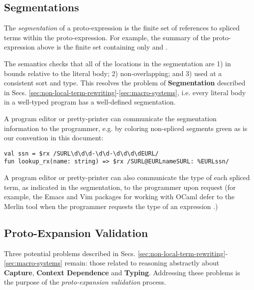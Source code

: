

\subsection{Segmentations}
The \emph{segmentation} of a proto-expression is the finite set of references to spliced terms within the proto-expression. For example, the summary of the proto-expression above is the finite set containing only  and .%

The semantics checks that all of the locations in the segmentation are 1) in bounds relative to the literal body; 2) non-overlapping; and 3) used at a consistent sort and type. 
This resolves the problem of \textbf{Segmentation} described in Secs. \ref{sec:non-local-term-rewriting}-\ref{sec:macro-systems}, i.e. every literal body in a well-typed program has a well-defined segmentation. 

A program editor or pretty-printer can communicate the segmentation information to the programmer, e.g. by coloring non-spliced segments green as is our convention in this document:
\begin{lstlisting}[numbers=none]
val ssn = $rx /SURL\d\d\d-\d\d-\d\d\d\dEURL/
fun lookup_rx(name: string) => $rx /SURL@EURLnameSURL: %EURLssn/ 
\end{lstlisting}

A program editor or pretty-printer can also communicate the type of each spliced term, as indicated in the segmentation, to the programmer upon request (for example, the Emacs and Vim packages for working with OCaml defer to the Merlin tool when the programmer requests the type of an expression \cite{Merlin}.)


\subsection{Proto-Expansion Validation}\label{sec:uetsms-validation}
Three potential problems described in Secs. \ref{sec:non-local-term-rewriting}-\ref{sec:macro-systems} remain: those related to reasoning abstractly about \textbf{Capture}, \textbf{Context Dependence} and \textbf{Typing}. Addressing these problems is the purpose of the \emph{proto-expansion validation} process.


